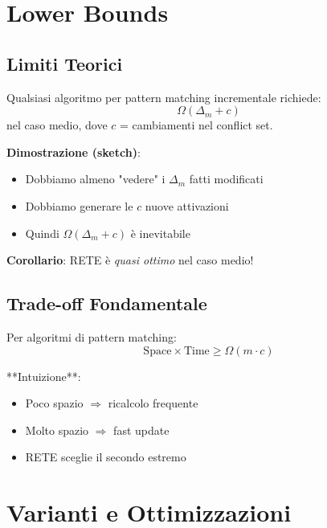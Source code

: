 \section{Lower Bounds}

\subsection{Limiti Teorici}

\begin{teorema}
Qualsiasi algoritmo per pattern matching incrementale richiede:
\begin{equation}
\Omega(\Delta_m + c)
\end{equation}
nel caso medio, dove $c$ = cambiamenti nel conflict set.
\end{teorema}

\textbf{Dimostrazione (sketch)}:
\begin{itemize}
\item Dobbiamo almeno "vedere" i $\Delta_m$ fatti modificati
\item Dobbiamo generare le $c$ nuove attivazioni
\item Quindi $\Omega(\Delta_m + c)$ è inevitabile
\end{itemize}

\textbf{Corollario}: RETE è \textit{quasi ottimo} nel caso medio!

\subsection{Trade-off Fondamentale}

\begin{teorema}
Per algoritmi di pattern matching:
\begin{equation}
\text{Space} \times \text{Time} \geq \Omega(m \cdot c)
\end{equation}
\end{teorema}

**Intuizione**:
\begin{itemize}
\item Poco spazio $\Rightarrow$ ricalcolo frequente
\item Molto spazio $\Rightarrow$ fast update
\item RETE sceglie il secondo estremo
\end{itemize}

\section{Varianti e Ottimizzazioni}

